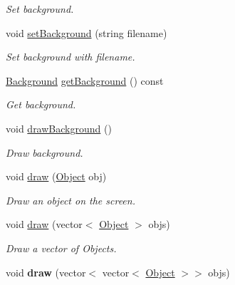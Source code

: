 \begin{DoxyCompactItemize}
\begin{DoxyCompactList}\small\item\em Set background. \end{DoxyCompactList}\item 
void \hyperlink{classEngine_a376e4a1ba9adc079e1da9b28a290abd2}{set\+Background} (string filename)\hypertarget{classEngine_a376e4a1ba9adc079e1da9b28a290abd2}{}\label{classEngine_a376e4a1ba9adc079e1da9b28a290abd2}

\begin{DoxyCompactList}\small\item\em Set background with filename. \end{DoxyCompactList}\item 
\hyperlink{classBackground}{Background} \hyperlink{classEngine_aa9398f6b48392dc520ab8c529e1d10c4}{get\+Background} () const \hypertarget{classEngine_aa9398f6b48392dc520ab8c529e1d10c4}{}\label{classEngine_aa9398f6b48392dc520ab8c529e1d10c4}

\begin{DoxyCompactList}\small\item\em Get background. \end{DoxyCompactList}\item 
void \hyperlink{classEngine_aa84c13e84d00fd3b0389a9a076ec194f}{draw\+Background} ()\hypertarget{classEngine_aa84c13e84d00fd3b0389a9a076ec194f}{}\label{classEngine_aa84c13e84d00fd3b0389a9a076ec194f}

\begin{DoxyCompactList}\small\item\em Draw background. \end{DoxyCompactList}\item 
void \hyperlink{classEngine_a276e63ae5648c36051c21c5b7c5dfb4b}{draw} (\hyperlink{classObject}{Object} obj)\hypertarget{classEngine_a276e63ae5648c36051c21c5b7c5dfb4b}{}\label{classEngine_a276e63ae5648c36051c21c5b7c5dfb4b}

\begin{DoxyCompactList}\small\item\em Draw an object on the screen. \end{DoxyCompactList}\item 
void \hyperlink{classEngine_a212b1b788cae7931fda927c0cbd2e165}{draw} (vector$<$ \hyperlink{classObject}{Object} $>$ objs)\hypertarget{classEngine_a212b1b788cae7931fda927c0cbd2e165}{}\label{classEngine_a212b1b788cae7931fda927c0cbd2e165}

\begin{DoxyCompactList}\small\item\em Draw a vector of Objects. \end{DoxyCompactList}\item 
void {\bfseries draw} (vector$<$ vector$<$ \hyperlink{classObject}{Object} $>$$>$ objs)\hypertarget{classEngine_afa41c75e3e6f47f5af9b7ad649d05564}{}\label{classEngine_afa41c75e3e6f47f5af9b7ad649d05564}


\end{DoxyCompactItemize}
